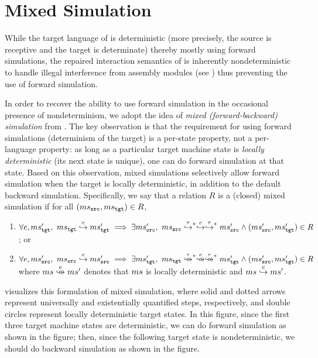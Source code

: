 \section{Mixed Simulation}
\label{sec:overview-verification:mixedsim}

While the target language of \cc{} is deterministic (more precisely,
the source is receptive and the target is determinate) thereby mostly
using forward simulations, the repaired interaction semantics of
\ccm{} is inherently nondeterministic to handle illegal interference from assembly modules
(see ) thus preventing the
use of forward simulation.

In order to recover the ability to use forward simulation in the occasional presence of nondeterminism,
we adopt the idea of \emph{mixed (forward-backward) simulation} from \cite{neis:pilsner}.
The key observation is that
the requirement for using forward simulations (\ie determinism of the target) is a per-state property,
not a per-language property: as long as a particular target machine state is \emph{locally deterministic} (\ie its next state is unique),
one can do forward simulation at that state.
Based on this observation, mixed simulations selectively allow forward
simulation when the target is locally deterministic, in addition to
the default backward simulation.
%
Specifically, we say that a relation $R$ is a (closed) mixed simulation if
for all $(ms{}_{\texttt{src}{}}, ms{}_{\texttt{tgt}{}}) \in R$,
\begin{enumerate}
\item
  $\forall e, \mstgt',~ \mstgt \estep{e} \mstgt' \implies {}
  \exists \mssrc',~ \mssrc \estep{\tau}^{\raisebox{-1mm}{\scriptsize$\ast$}} \estep{e}\estep{\tau}^{\raisebox{-1mm}{\scriptsize$\ast$}} \mssrc' \land (\mssrc', \mstgt') \in R$; or
\item
  $\forall e, \mssrc',~ \mssrc \estep{e} \mssrc' \implies {}
  \exists \mstgt',~ \mstgt \eustep{\tau}^{\raisebox{-1mm}{\scriptsize$\ast$}} \eustep{e}\eustep{\tau}^{\raisebox{-1mm}{\scriptsize$\ast$}} \mstgt' \land (\mssrc', \mstgt') \in R$\\
  where $\ms \eustep{e} \ms'$ denotes that $ms$ is locally deterministic and $ms \stackrel{e}{\hookrightarrow} ms'$.
\end{enumerate}

 visualizes this formulation of mixed simulation, where
solid and dotted arrows represent universally and existentially
quantified steps, respectively, and double circles represent locally
deterministic target states. In this figure,
since the first three target machine states are deterministic,
we can do forward simulation as shown in the figure;
then, since the following target state is nondeterministic,
we should do backward simulation as shown in the figure.

